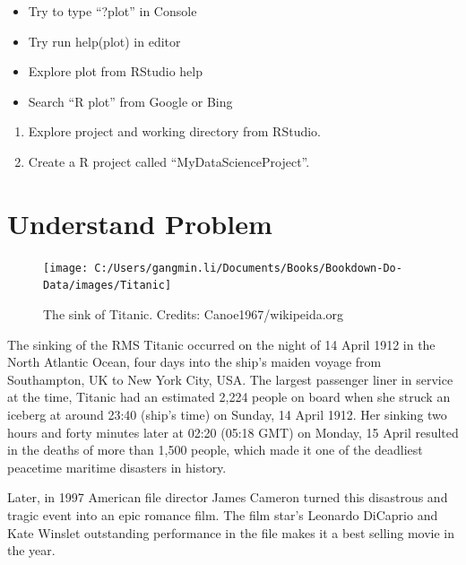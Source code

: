 \documentclass[
]{book}
\providecommand{\tightlist}{%
  \setlength{\itemsep}{0pt}\setlength{\parskip}{0pt}}
\renewenvironment{quote}{\begin{VF}}{\end{VF}}
\begin{document}
\begin{itemize}
\tightlist
\item
  Try to type ``?plot'' in Console
\item
  Try run help(plot) in editor
\item
  Explore plot from RStudio help
\item
  Search ``R plot'' from Google or Bing
\end{itemize}

\begin{enumerate}
\def\labelenumi{\arabic{enumi}.}
\setcounter{enumi}{3}
\tightlist
\item
  Explore project and working directory from RStudio.
\item
  Create a R project called ``MyDataScienceProject''.
\end{enumerate}

\hypertarget{prob}{%
\chapter{Understand Problem}\label{prob}}

\begin{figure}

{\centering \texttt{[image: C:/Users/gangmin.li/Documents/Books/Bookdown-Do-Data/images/Titanic]} 

}

\caption{The sink of Titanic. Credits: Canoe1967/wikipeida.org}\label{fig:unnamed-chunk-7}
\end{figure}

\begin{quote}
\end{quote}

The sinking of the RMS Titanic occurred on the night of 14 April 1912 in the North Atlantic Ocean, four days into the ship's maiden voyage from Southampton, UK to New York City, USA. The largest passenger liner in service at the time, Titanic had an estimated 2,224 people on board when she struck an iceberg at around 23:40 (ship's time) on Sunday, 14 April 1912. Her sinking two hours and forty minutes later at 02:20 (05:18 GMT) on Monday, 15 April resulted in the deaths of more than 1,500 people, which made it one of the deadliest peacetime maritime disasters in history.

Later, in 1997 American file director James Cameron turned this disastrous and tragic event into an epic romance film. The film star's Leonardo DiCaprio and Kate Winslet outstanding performance in the file makes it a best selling movie in the year.
\end{document}
